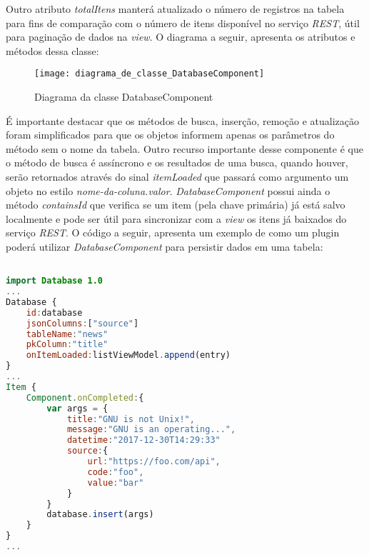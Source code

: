 Outro atributo \textit{totalItens} manterá atualizado o número de registros na tabela para fins de comparação com o número de itens disponível no serviço \textit{REST}, útil para paginação de dados na \textit{view}. O diagrama a seguir, apresenta os atributos e métodos dessa classe:

\begin{figure}[H]
	\texttt{[image: diagrama\_de\_classe\_DatabaseComponent]}
	\centering
	\caption{Diagrama da classe DatabaseComponent}
\end{figure}

É importante destacar que os métodos de busca, inserção, remoção e atualização foram simplificados para que os objetos informem apenas os parâmetros do método sem o nome da tabela. Outro recurso importante desse componente é que o método de busca é assíncrono e os resultados de uma busca, quando houver, serão retornados através do sinal \textit{itemLoaded} que passará como argumento um objeto no estilo \textit{nome-da-coluna.valor}. \textit{DatabaseComponent} possui ainda o método \textit{containsId} que verifica se um item (pela chave primária) já está salvo localmente e pode ser útil para sincronizar com a \textit{view} os itens já baixados do serviço \textit{REST}. O código a seguir, apresenta um exemplo de como um plugin poderá utilizar \textit{DatabaseComponent} para persistir dados em uma tabela:

\begin{center}
\begin{lstlisting}[language=qml]

import Database 1.0
...
Database {
	id:database
	jsonColumns:["source"]
	tableName:"news"
	pkColumn:"title"
	onItemLoaded:listViewModel.append(entry)
}
...
Item {
	Component.onCompleted:{
		var args = {
			title:"GNU is not Unix!",
			message:"GNU is an operating...",
			datetime:"2017-12-30T14:29:33"
			source:{
				url:"https://foo.com/api",
				code:"foo",
				value:"bar"
			}
		}
		database.insert(args)
	}
}
...
\end{lstlisting}
\end{center}



